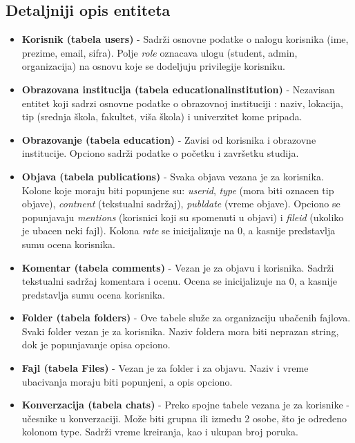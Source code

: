\subsection{Detaljniji opis entiteta}
\begin{itemize}
    \item \textbf{Korisnik (tabela users)} -
    Sadrži osnovne podatke o nalogu korisnika (ime, prezime, email, sifra). Polje \textit{role} oznacava ulogu (student, admin, organizacija) na osnovu koje se dodeljuju privilegije korisniku.
    
    \item \textbf{Obrazovana institucija (tabela educational\textunderscore institution)} -
    Nezavisan entitet koji sadrzi osnovne podatke o obrazovnoj instituciji : naziv, lokacija, tip (srednja škola, fakultet, viša škola) i univerzitet kome pripada.
    
    \item \textbf{Obrazovanje (tabela education)} -
    Zavisi od korisnika i obrazovne institucije. Opciono sadrži podatke o početku i završetku studija.
    
    \item \textbf{Objava (tabela publications)} - 
    Svaka objava vezana je za korisnika. Kolone koje moraju biti popunjene su:\textit{ user\textunderscore id}, \textit{type} (mora biti oznacen tip objave), \textit{contnent} (tekstualni sadržaj),\textit{ publ\textunderscore date }(vreme objave). Opciono se popunjavaju \textit{mentions} (korisnici koji su spomenuti u objavi) i \textit{file\textunderscore id} (ukoliko je ubacen neki fajl). Kolona \textit{rate} se inicijalizuje na 0, a kasnije predstavlja sumu ocena korisnika.
    
    \item \textbf{Komentar (tabela comments)} -
    Vezan je za objavu i korisnika. Sadrži tekstualni sadržaj komentara i ocenu. Ocena se inicijalizuje na 0, a kasnije predstavlja sumu ocena korisnika.
    
    \item \textbf{Folder (tabela folders)} -
    Ove tabele služe za organizaciju ubačenih fajlova. Svaki folder vezan je za korisnika. Naziv foldera mora biti neprazan string, dok je popunjavanje opisa opciono.
    
    \item \textbf{Fajl (tabela Files)} -
    Vezan je za folder i za objavu. Naziv i vreme ubacivanja moraju biti popunjeni, a opis opciono.
    
    \item \textbf{Konverzacija (tabela chats)} -
    Preko spojne tabele vezana je za korisnike - učesnike u konverzaciji. Može biti grupna ili između 2 osobe, što je određeno kolonom type. Sadrži vreme kreiranja, kao i ukupan broj poruka.
    

\end{itemize}
